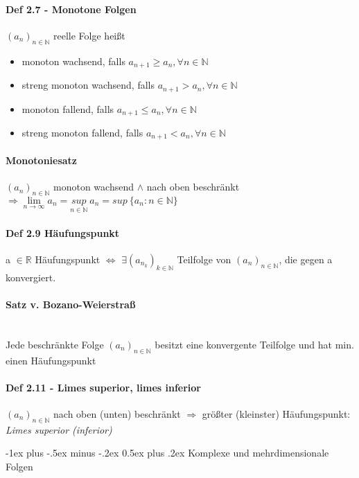 \documentclass[paper=a3,paper=landscape, fontsize=9pt, DIV=30]{scrartcl}
\makeatletter
\newcommand{\real}{{\mathbb{R}}}
\newcommand{\nat}{\mathbb{N}}
\newcommand{\aseq}{(a_n)_{n \in \nat}}
\renewcommand{\section}{\@startsection{section}{1}{0mm}%
  {-1ex plus -.5ex minus -.2ex}%
  {0.5ex plus .2ex}%
  {\color{blue}\normalfont\large\bfseries}}
\makeatother
\begin{document}
\begin{multicols*}{4}
  \paragraph{Def 2.7 - Monotone Folgen}
  $\aseq$ reelle Folge heißt
  \begin{itemize}
  \item monoton wachsend, falls $a_{n+1} \geq a_n, \forall n \in \nat$
  \item streng monoton wachsend, falls  $a_{n+1} > a_n, \forall n \in \nat$
  \item monoton fallend, falls  $a_{n+1} \leq a_n, \forall n \in \nat$
  \item streng monoton fallend, falls  $a_{n+1} < a_n, \forall n \in \nat$
  \end{itemize}

 \paragraph{Monotoniesatz}
 $\aseq$ monoton wachsend $\wedge$ nach oben beschränkt $\Rightarrow \lim\limits_{n \rightarrow \infty} a_n = \underset{n \in \nat}{sup}\:a_n = sup\:\{a_n:n \in \nat\}$


  \paragraph{Def 2.9 Häufungspunkt}
  a $\in \real$ Häufungspunkt $\Leftrightarrow$ $ \exists (a_{n_k})_{k \in \nat}$ Teilfolge von $\aseq$, die gegen a konvergiert.


 \paragraph{Satz v. Bozano-Weierstraß}\hspace{0pt} \\
 Jede beschränkte Folge $\aseq$ besitzt eine konvergente Teilfolge und hat min. einen Häufungspunkt


  \paragraph{Def 2.11 - Limes superior, limes inferior}
  $\aseq$ nach oben (unten) beschränkt $\Rightarrow$ größter (kleinster) Häufungspunkt: \emph{Limes superior (inferior)}



\section{Komplexe und mehrdimensionale Folgen}


\end{multicols*}
\end{document}
